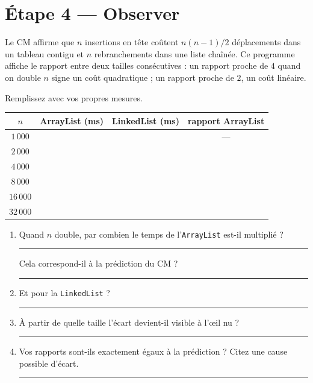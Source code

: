 \documentclass[11pt,a4paper]{article}
\newcommand{\lig}[1]{\rule{#1}{0.4pt}}
\begin{document}
\section{Étape 4 --- Observer}

\begin{lienbox}[Ce qu'on matérialise du CM]
Le CM affirme que $n$ insertions en tête coûtent $n(n-1)/2$ déplacements
dans un tableau contigu et $n$ rebranchements dans une liste chaînée. Ce
programme affiche le rapport entre deux tailles consécutives : un rapport
proche de $4$ quand on double $n$ signe un coût quadratique ; un rapport
proche de $2$, un coût linéaire.
\end{lienbox}

\begin{exercicebox}
Remplissez avec vos propres mesures.

\vspace{0.2cm}
\begin{center}
\begin{tabular}{cccc}
\toprule
$n$ & \textbf{ArrayList (ms)} & \textbf{LinkedList (ms)} & \textbf{rapport ArrayList} \\
\midrule
$1\,000$  & \rule{0pt}{0.7cm} & & --- \\
$2\,000$  & \rule{0pt}{0.7cm} & & \\
$4\,000$  & \rule{0pt}{0.7cm} & & \\
$8\,000$  & \rule{0pt}{0.7cm} & & \\
$16\,000$ & \rule{0pt}{0.7cm} & & \\
$32\,000$ & \rule{0pt}{0.7cm} & & \\
\bottomrule
\end{tabular}
\end{center}

\vspace{0.3cm}
\begin{enumerate}[nosep]
    \item Quand $n$ double, par combien le temps de l'\texttt{ArrayList}
          est-il multiplié ? \lig{3cm} \quad Cela correspond-il à la
          prédiction du CM ? \lig{4cm}
    \item Et pour la \texttt{LinkedList} ? \lig{6cm}
    \item À partir de quelle taille l'écart devient-il visible à l'œil nu ?
          \lig{4cm}
    \item Vos rapports sont-ils exactement égaux à la prédiction ? Citez une
          cause possible d'écart. \lig{7cm}
\end{enumerate}
\end{exercicebox}
\end{document}
